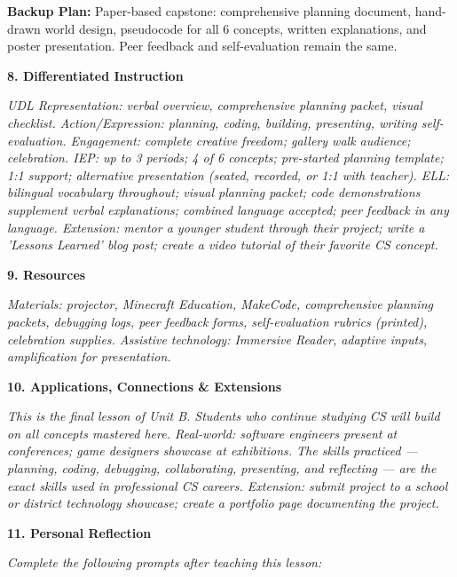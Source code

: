 \documentclass[11pt,letterpaper]{article}
\begin{document}
\textbf{Backup Plan: }Paper-based capstone: comprehensive planning document, hand-drawn world design, pseudocode for all 6 concepts, written explanations, and poster presentation. Peer feedback and self-evaluation remain the same.

\textbf{8. Differentiated Instruction}

\textit{UDL Representation: verbal overview, comprehensive planning packet, visual checklist. Action/Expression: planning, coding, building, presenting, writing self-evaluation. Engagement: complete creative freedom; gallery walk audience; celebration. IEP: up to 3 periods; 4 of 6 concepts; pre-started planning template; 1:1 support; alternative presentation (seated, recorded, or 1:1 with teacher). ELL: bilingual vocabulary throughout; visual planning packet; code demonstrations supplement verbal explanations; combined language accepted; peer feedback in any language. Extension: mentor a younger student through their project; write a 'Lessons Learned' blog post; create a video tutorial of their favorite CS concept.}

\textbf{9. Resources}

\textit{Materials: projector, Minecraft Education, MakeCode, comprehensive planning packets, debugging logs, peer feedback forms, self-evaluation rubrics (printed), celebration supplies. Assistive technology: Immersive Reader, adaptive inputs, amplification for presentation.}

\textbf{10. Applications, Connections \& Extensions}

\textit{This is the final lesson of Unit B. Students who continue studying CS will build on all concepts mastered here. Real-world: software engineers present at conferences; game designers showcase at exhibitions. The skills practiced --- planning, coding, debugging, collaborating, presenting, and reflecting --- are the exact skills used in professional CS careers. Extension: submit project to a school or district technology showcase; create a portfolio page documenting the project.}

\newpage
\textbf{11. Personal Reflection}

\textit{Complete the following prompts after teaching this lesson:}
\end{document}
